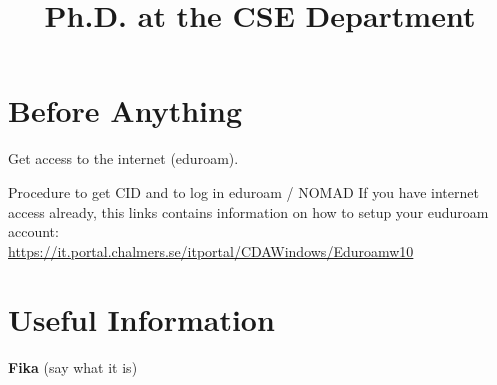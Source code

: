 \documentclass[10pt,a4paper,english]{article}
\title{Ph.D. at the CSE Department}
\begin{document}
\maketitle
\section*{Before Anything}
Get access to the internet (eduroam).

Procedure to get CID and to log in eduroam / NOMAD
If you have internet access already, this links contains information on how to setup your euduroam account: 
\\
\url{https://it.portal.chalmers.se/itportal/CDAWindows/Eduroamw10}
\section*{Useful Information}
\textbf{Fika} (say what it is)
\end{document}
